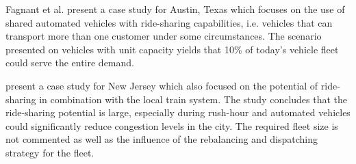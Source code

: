 
Fagnant et al. \cite{fagnant2015dynamic} present a case study for Austin, Texas
which focuses on the use of shared automated vehicles with ride-sharing capabilities,
i.e. vehicles that can transport more than one customer under some circumstances.
The scenario presented on vehicles with unit capacity yields that 10\% of today's
vehicle fleet could serve the entire demand. %

\cite{zachariah2014uncongested} present a case study for New Jersey which also focused
on the potential of ride-sharing in combination with the local train system.
The study concludes that the ride-sharing potential
is large, especially during rush-hour and automated vehicles could significantly
reduce congestion levels in the city. The required fleet size is not commented
as well as the influence of the rebalancing and dispatching strategy for the fleet.

